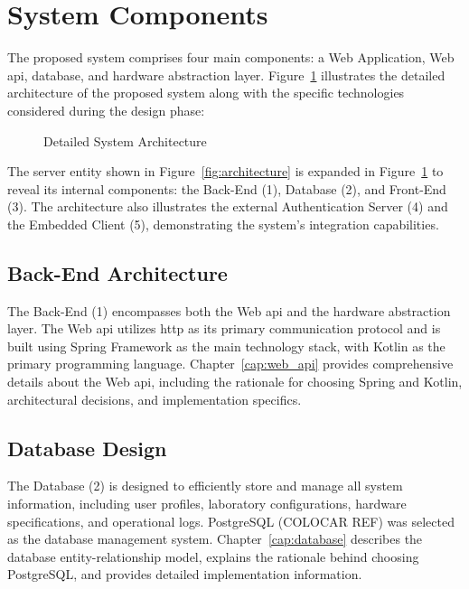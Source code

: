 \section{System Components}\label{sec:system_components}
The proposed system comprises four main components: a Web Application, Web \ac{api}, database, and hardware abstraction layer. Figure~\ref{fig:detailed_architecture} illustrates the detailed architecture of the proposed system along with the specific technologies considered during the design phase:

\begin{figure}[H]
    \centering
    
\caption{Detailed System Architecture}
\label{fig:detailed_architecture}
\end{figure}

The server entity shown in Figure~\ref{fig:architecture} is expanded in Figure~\ref{fig:detailed_architecture} to reveal its internal components: the Back-End (1), Database (2), and Front-End (3). The architecture also illustrates the external Authentication Server (4) and the Embedded Client (5), demonstrating the system's integration capabilities.

\subsection*{Back-End Architecture}
The Back-End (1) encompasses both the Web \ac{api} and the hardware abstraction layer. The Web \ac{api} utilizes \ac{http} as its primary communication protocol and is built using Spring Framework as the main technology stack, with Kotlin as the primary programming language. Chapter~\ref{cap:web_api} provides comprehensive details about the Web \ac{api}, including the rationale for choosing Spring and Kotlin, architectural decisions, and implementation specifics.

\subsection*{Database Design}
The Database (2) is designed to efficiently store and manage all system information, including user profiles, laboratory configurations, hardware specifications, and operational logs. PostgreSQL (COLOCAR REF) was selected as the database management system. Chapter~\ref{cap:database} describes the database entity-relationship model, explains the rationale behind choosing PostgreSQL, and provides detailed implementation information.

